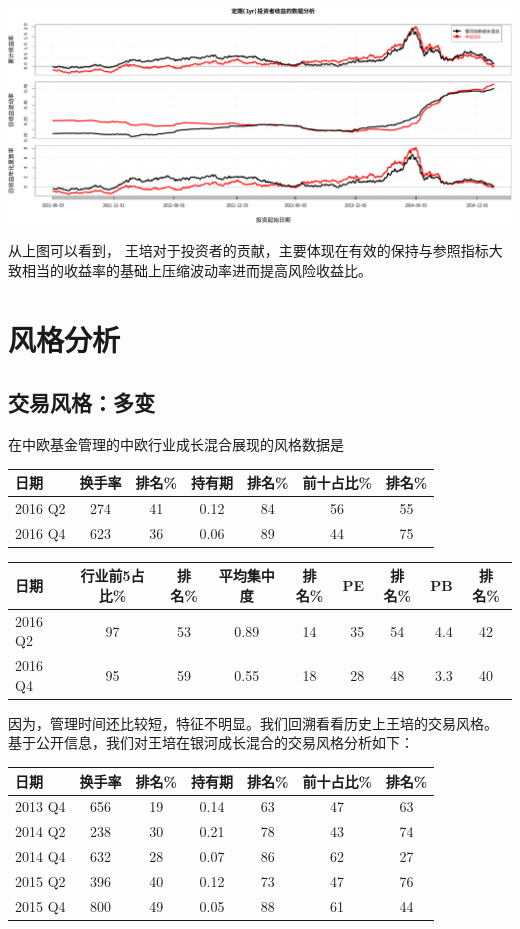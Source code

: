 \documentclass[hyperref,]{ctexart}
\begin{document}
\includegraphics{wangpei-details_files/figure-latex/unnamed-chunk-8-2.pdf}

从上图可以看到，
王培对于投资者的贡献，主要体现在有效的保持与参照指标大致相当的收益率的基础上压缩波动率进而提高风险收益比。

\section{风格分析}

\subsection{交易风格：多变}

在中欧基金管理的中欧行业成长混合展现的风格数据是

\begin{longtable}[]{@{}lcccccc@{}}
\toprule
日期 & 换手率 & 排名\% & 持有期 & 排名\% & 前十占比\% &
排名\%\tabularnewline
\midrule
\endhead
2016 Q2 & 274 & 41 & 0.12 & 84 & 56 & 55\tabularnewline
2016 Q4 & 623 & 36 & 0.06 & 89 & 44 & 75\tabularnewline
\bottomrule
\end{longtable}

\begin{longtable}[]{@{}lccccrcrc@{}}
\toprule
日期 & 行业前5占比\% & 排名\% & 平均集中度 & 排名\% & PE & 排名\% & PB &
排名\%\tabularnewline
\midrule
\endhead
2016 Q2 & 97 & 53 & 0.89 & 14 & 35 & 54 & 4.4 & 42\tabularnewline
2016 Q4 & 95 & 59 & 0.55 & 18 & 28 & 48 & 3.3 & 40\tabularnewline
\bottomrule
\end{longtable}

因为，管理时间还比较短，特征不明显。我们回溯看看历史上王培的交易风格。
基于公开信息，我们对王培在银河成长混合的交易风格分析如下：

\begin{longtable}[]{@{}lcccccc@{}}
\toprule
日期 & 换手率 & 排名\% & 持有期 & 排名\% & 前十占比\% &
排名\%\tabularnewline
\midrule
\endhead
2013 Q4 & 656 & 19 & 0.14 & 63 & 47 & 63\tabularnewline
2014 Q2 & 238 & 30 & 0.21 & 78 & 43 & 74\tabularnewline
2014 Q4 & 632 & 28 & 0.07 & 86 & 62 & 27\tabularnewline
2015 Q2 & 396 & 40 & 0.12 & 73 & 47 & 76\tabularnewline
2015 Q4 & 800 & 49 & 0.05 & 88 & 61 & 44\tabularnewline
\bottomrule
\end{longtable}
\end{document}
